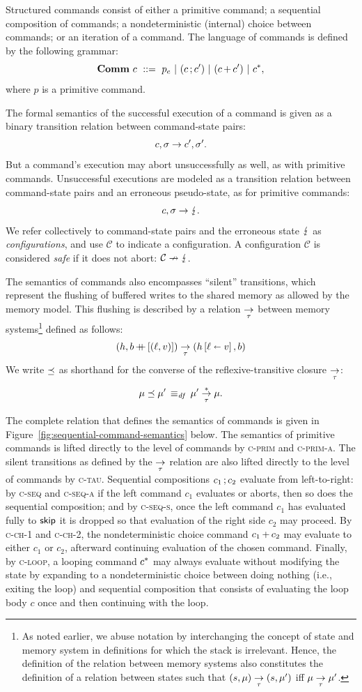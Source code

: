 \documentclass[11pt]{report}
\begin{document}
Structured commands consist of either a primitive command; a sequential composition of commands; a nondeterministic (internal) choice between commands; or an iteration of a command. The language of commands is defined by the following grammar: \[ \mathbf{Comm}~c ~::=~ p_e ~|~ (c \operatorname{;} c') ~|~ (c \operatorname{+} c') ~|~ c^{\operatorname{\ast}},\] where $p$ is a primitive command.  

The formal semantics of the successful execution of a command is given as a binary transition relation between command-state pairs: \[ c,\sigma \rightarrow c',\sigma'.\] But a command's execution may abort unsuccessfully as well, as with primitive commands. Unsuccessful executions are modeled as a transition relation between command-state pairs and an erroneous pseudo-state, as for primitive commands: \[ c,\sigma \rightarrow \lightning. \] We refer collectively to command-state pairs and the erroneous state $\lightning$ as \emph{configurations}, and use $\mathcal{C}$ to indicate a configuration. A configuration $\mathcal{C}$ is considered \emph{safe} if it does not abort: $\mathcal{C} \nrightarrow \lightning$.

The semantics of commands also encompasses ``silent'' transitions, which represent the flushing of buffered writes to the shared memory as allowed by the memory model. This flushing is described by a relation $\underset{\tau}{\rightarrow}$ between memory systems\footnote{As noted earlier, we abuse notation by interchanging the concept of state and memory system in definitions for which the stack is irrelevant. Hence, the definition of the relation between memory systems  also constitutes the definition of a relation between states such that $(s,\mu) \underset{\tau}{\rightarrow} (s,\mu')$ iff $\mu \underset{\tau}{\rightarrow} \mu'$.} defined as follows: \begin{align*} (h,b \operatorname{+\!\!\!+} \left[(\ell,v)\right]) \underset{\tau}{\rightarrow} (h \left[ \ell \shortleftarrow v \right],b) 
\end{align*} We write $\preceq$ as shorthand for the converse of the reflexive-transitive closure $\underset{\tau}{\rightarrow}$: \[ \mu \preceq \mu' \operatorname{\;\equiv_{\mathit{df}}\;} \mu' \overset{\ast}{\underset{\tau}{\rightarrow}} \mu.\] 

The complete relation that defines the semantics of commands is given in Figure~\ref{fig:sequential-command-semantics} below. The semantics of primitive commands is lifted directly to the level of commands by \textsc{c-prim} and \textsc{c-prim-a}. The silent transitions as defined by the $\underset{\tau}{\rightarrow}$ relation are also lifted directly to the level of commands by \textsc{c-tau}. Sequential compositions $c_1 \operatorname{;} c_2$ evaluate from left-to-right: by \textsc{c-seq} and \textsc{c-seq-a} if the left command $c_1$ evaluates or aborts, then so does the sequential composition; and by \textsc{c-seq-s}, once the left command $c_1$ has evaluated fully to $\operatorname{\mathsf{skip}}$ it is dropped so that evaluation of the right side $c_2$ may proceed. By \textsc{c-ch-1} and \textsc{c-ch-2}, the nondeterministic choice command $c_1 \operatorname{+} c_2$ may evaluate to either $c_1$ or $c_2$, afterward continuing evaluation of the chosen command. Finally, by \textsc{c-loop}, a looping command $c^{\operatorname{\ast}}$ may always evaluate without modifying the state by expanding to a nondeterministic choice between doing nothing (i.e., exiting the loop) and sequential composition that consists of evaluating the loop body $c$ once and then continuing with the loop. 
\end{document}
